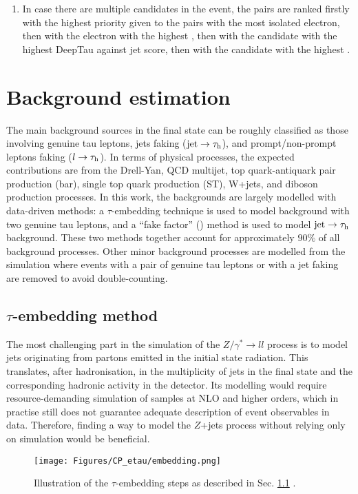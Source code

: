 \begin{enumerate}
    \item In case there are multiple \et candidates in the event, the pairs are ranked firstly with the highest priority given to the pairs with the most isolated electron, then with the electron with the highest \pt, then with the \tauh candidate with the highest DeepTau against jet score, then with the \tauh candidate with the highest \pt.
\end{enumerate}


\section{Background estimation}\label{sec:bkgr}
The main background sources in the \et final state can be roughly classified as those involving genuine tau leptons, jets faking \tauh ($\text{jet}\to \tau_\mathrm{h}$), and prompt/non-prompt leptons faking \tauh ($l\to \tau_\mathrm{h}$). In terms of physical processes, the expected contributions are from the Drell-Yan, QCD multijet, top
quark-antiquark pair production (bar), single top quark production (ST), W+jets, and diboson production processes. In this work, the backgrounds are largely modelled with data-driven methods: a $\tau$-embedding technique \cite{CMS:2019pkt} is used to model background with two genuine tau leptons, and a \enquote{fake factor} (\ff) method \cite{CMS:2018lkr} is used to model $\text{jet}\to \tau_\mathrm{h}$ background. These two methods together account for approximately $90\%$ of all background processes. Other minor background processes are modelled from the simulation where events with a pair of genuine tau leptons or with a jet faking \tauh are removed to avoid double-counting. 

\subsection{$\tau$-embedding method}\label{sec:emb}
The most challenging part in the simulation of the $Z/\gamma^* \to ll$ process is to model jets originating from partons emitted in the initial state radiation. This translates, after hadronisation, in the multiplicity of jets in the final state and the corresponding hadronic activity in the detector. Its modelling would require resource-demanding simulation of samples at NLO and higher orders, which in practise still does not guarantee adequate description of event observables in data. Therefore, finding a way to model the $Z$+jets process without relying only on simulation would be beneficial. 

\begin{figure}[t!]
    \centering
    \texttt{[image: Figures/CP\_etau/embedding.png]}
    \caption{Illustration of the $\tau$-embedding steps as described in Sec. \ref{sec:emb} \cite{CMS:2019pkt}.}
    \label{fig:emb}
\end{figure}

